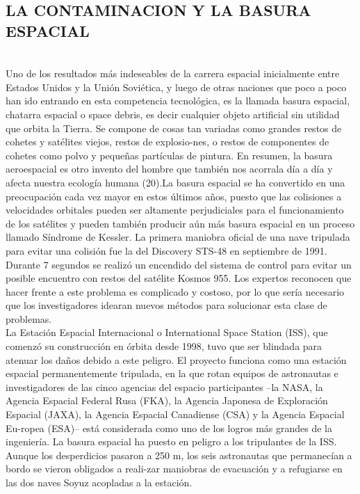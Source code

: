 \documentclass[12pt,letterpaper]{article}
\begin{document}
\begin{multicols}{2}
\section*{\noindent \small {LA CONTAMINACION Y LA BASURA ESPACIAL}}
\\
\noindent Uno  de  los  resultados  más  indeseables  de  la  carrera  espacial inicialmente entre Estados Unidos y la Unión Soviética,  y  luego  de  otras  naciones  que  poco  a  poco  han ido entrando en esta competencia tecnológica, es la llamada basura espacial, chatarra espacial o space debris, es decir cualquier objeto artificial sin utilidad que orbita la Tierra. Se compone de cosas tan variadas como grandes restos de cohetes y satélites viejos, restos de explosio-nes, o restos de componentes de cohetes como polvo y pequeñas partículas de pintura. En resumen, la basura aeroespacial es otro invento del hombre que también nos acorrala día a día y afecta nuestra ecología humana (20).La basura espacial se ha convertido en una preocupación cada vez mayor en estos últimos años, puesto que las colisiones a velocidades orbitales pueden ser altamente perjudiciales para el funcionamiento de los satélites y pueden también producir aún más basura espacial en un proceso llamado Síndrome de Kessler. La primera maniobra oficial de una nave tripulada para evitar una colisión fue la del Discovery STS-48 en septiembre de 1991. Durante 7 segundos se realizó un encendido del sistema de control para evitar un posible encuentro con restos del satélite Kosmos 955. Los expertos reconocen que hacer frente a este problema es complicado y costoso, por lo que sería necesario que los investigadores idearan nuevos métodos para solucionar esta clase de problemas.
\\

\noindent La  Estación  Espacial  Internacional  o  International  Space Station (ISS), que comenzó su construcción en órbita desde 1998, tuvo que ser blindada para atenuar los daños debido a este peligro. El proyecto funciona como una estación espacial permanentemente tripulada, en la que rotan equipos de astronautas e investigadores de las cinco agencias del espacio participantes –la NASA, la Agencia  Espacial  Federal  Rusa  (FKA),  la  Agencia  Japonesa  de  Exploración  Espacial  (JAXA),  la  Agencia  Espacial Canadiense (CSA) y la Agencia Espacial Eu-ropea (ESA)– está considerada como uno de los logros más  grandes  de  la  ingeniería.  La  basura  espacial  ha  puesto  en  peligro  a  los  tripulantes  de  la  ISS.  Aunque  los desperdicios pasaron a 250 m, los seis astronautas que permanecían a bordo se vieron obligados a reali-zar maniobras de evacuación y a refugiarse en las dos naves Soyuz acopladas a la estación.
\end{multicols}
\newpage
\end{document}
